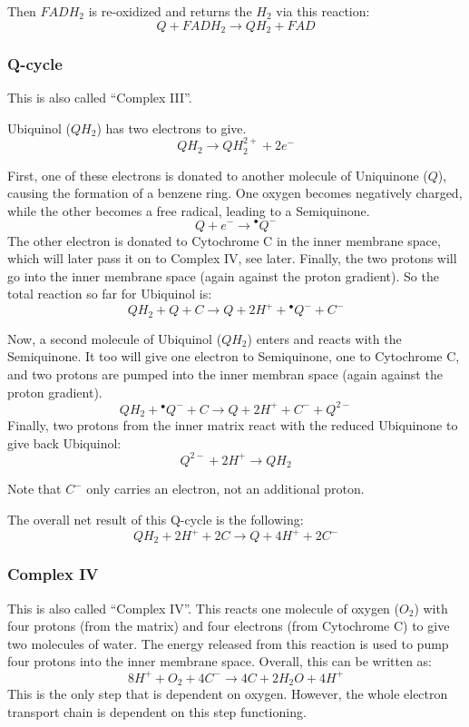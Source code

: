 \documentclass{article}
\begin{document}
Then $FADH_2$ is re-oxidized and returns the $H_2$ via this reaction:
\[
    Q + FADH_2 \rightarrow QH_2 + FAD
\]

\subsubsection{Q-cycle}
This is also called ``Complex III''.

Ubiquinol ($QH_2$) has two electrons to give.
\[
    QH_2 \rightarrow QH_2^{2+} + 2e^-
\]

First, one of these electrons is donated to another molecule of Uniquinone ($Q$), causing the
formation of a benzene ring.  One oxygen becomes negatively charged, while the other
becomes a free radical, leading to a Semiquinone.
\[
    Q + e^- \rightarrow {}^{\bullet}Q^{-}
\]
The other electron is donated to Cytochrome C in the inner membrane space, which will later
pass it on to Complex IV, see later. Finally, the two protons will go into the inner
membrane space (again against the proton gradient). So the total reaction so far for
Ubiquinol is:
\[
    QH_2 + Q + C \rightarrow Q + 2H^+ + {}^{\bullet}Q^{-} + C^-
\]

Now, a second molecule of Ubiquinol ($QH_2$) enters and reacts with the Semiquinone.
It too will give one electron to Semiquinone, one to Cytochrome C, and two protons
are pumped into the inner membran space (again against the proton gradient).
\[
    QH_2 + {}^{\bullet}Q^{-} + C \rightarrow Q + 2H^+ + C^- + Q^{2-}
\]
Finally, two protons from the inner matrix react with the reduced Ubiquinone to give back
Ubiquinol:
\[
    Q^{2-} + 2H^+ \rightarrow QH_2
\]

Note that $C^-$ only carries an electron, not an additional proton.

The overall net result of this Q-cycle is the following:
\[
    QH_2 + 2H^+ + 2C \rightarrow Q + 4H^+ + 2C^-
\]

\subsubsection{Complex IV}
This is also called ``Complex IV''.
This reacts one molecule of oxygen ($O_2$) with four protons (from the matrix) and four
electrons (from Cytochrome C) to give two molecules of water. The energy released
from this reaction is used to pump four protons into the inner membrane space.
Overall, this can be written as:
\[
    8H^+ + O_2 + 4C^- \rightarrow 4C + 2H_2O + 4H^+
\]
This is the only step that is dependent on oxygen. However, the whole electron transport
chain is dependent on this step functioning.
\end{document}
